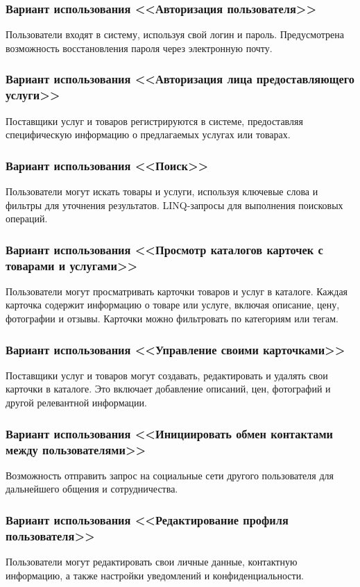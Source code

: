 \subsubsection{Вариант использования <<Авторизация пользователя>>} 
Пользователи входят в систему, используя свой логин и пароль. Предусмотрена возможность восстановления пароля через электронную почту.

\subsubsection{Вариант использования <<Авторизация лица предоставляющего услуги>>}
Поставщики услуг и товаров регистрируются в системе, предоставляя специфическую информацию о предлагаемых услугах или товарах.

\subsubsection{Вариант использования <<Поиск>>} 
Пользователи могут искать товары и услуги, используя ключевые слова и фильтры для уточнения результатов. LINQ-запросы для выполнения поисковых операций.

\subsubsection{Вариант использования <<Просмотр каталогов карточек с товарами и услугами>>}
Пользователи могут просматривать карточки товаров и услуг в каталоге. Каждая карточка содержит информацию о товаре или услуге, включая описание, цену, фотографии и отзывы. Карточки можно фильтровать по категориям или тегам.

\subsubsection{Вариант использования <<Управление своими карточками>>}
Поставщики услуг и товаров могут создавать, редактировать и удалять свои карточки в каталоге. Это включает добавление описаний, цен, фотографий и другой релевантной информации.

\subsubsection{Вариант использования <<Инициировать обмен контактами между пользователями>>} 
Возможность отправить запрос на социальные сети другого пользователя для дальнейшего общения и сотрудничества.

\subsubsection{Вариант использования <<Редактирование профиля пользователя>>}
Пользователи могут редактировать свои личные данные, контактную информацию, а также настройки уведомлений и конфиденциальности.

